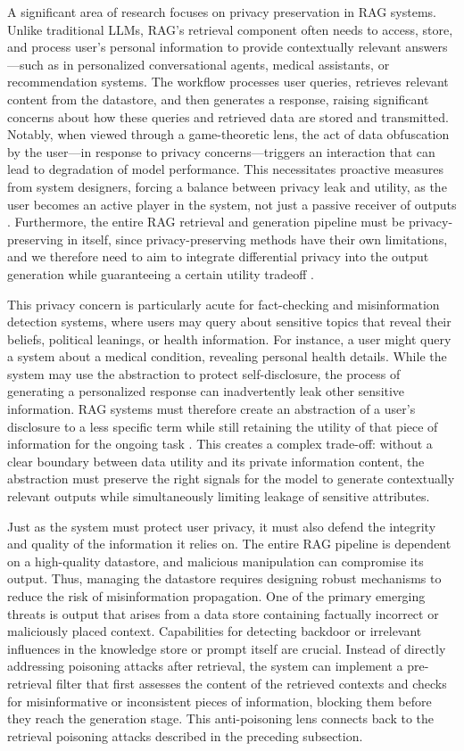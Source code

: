 \documentclass[11pt]{article}
\begin{document}
A significant area of research focuses on privacy preservation in RAG systems. Unlike traditional LLMs, RAG's retrieval component often needs to access, store, and process user's personal information to provide contextually relevant answers---such as in personalized conversational agents, medical assistants, or recommendation systems. The workflow processes user queries, retrieves relevant content from the datastore, and then generates a response, raising significant concerns about how these queries and retrieved data are stored and transmitted. Notably, when viewed through a game-theoretic lens, the act of data obfuscation by the user---in response to privacy concerns---triggers an interaction that can lead to degradation of model performance. This necessitates proactive measures from system designers, forcing a balance between privacy leak and utility, as the user becomes an active player in the system, not just a passive receiver of outputs \cite{ref164}. Furthermore, the entire RAG retrieval and generation pipeline must be privacy-preserving in itself, since privacy-preserving methods have their own limitations, and we therefore need to aim to integrate differential privacy into the output generation while guaranteeing a certain utility tradeoff \cite{ref165}.

This privacy concern is particularly acute for fact-checking and misinformation detection systems, where users may query about sensitive topics that reveal their beliefs, political leanings, or health information. For instance, a user might query a system about a medical condition, revealing personal health details. While the system may use the abstraction to protect self-disclosure, the process of generating a personalized response can inadvertently leak other sensitive information. RAG systems must therefore create an abstraction of a user's disclosure to a less specific term while still retaining the utility of that piece of information for the ongoing task \cite{ref166}. This creates a complex trade-off: without a clear boundary between data utility and its private information content, the abstraction must preserve the right signals for the model to generate contextually relevant outputs while simultaneously limiting leakage of sensitive attributes.

Just as the system must protect user privacy, it must also defend the integrity and quality of the information it relies on. The entire RAG pipeline is dependent on a high-quality datastore, and malicious manipulation can compromise its output. Thus, managing the datastore requires designing robust mechanisms to reduce the risk of misinformation propagation. One of the primary emerging threats is output that arises from a data store containing factually incorrect or maliciously placed context. Capabilities for detecting backdoor or irrelevant influences in the knowledge store or prompt itself are crucial. Instead of directly addressing poisoning attacks after retrieval, the system can implement a pre-retrieval filter that first assesses the content of the retrieved contexts and checks for misinformative or inconsistent pieces of information, blocking them before they reach the generation stage. This anti-poisoning lens connects back to the retrieval poisoning attacks described in the preceding subsection.
\end{document}
